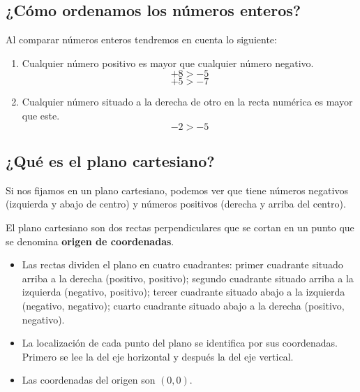\subsection{¿Cómo ordenamos los números enteros?}

Al comparar números enteros tendremos en cuenta lo siguiente:

\begin{enumerate}
    \item Cualquier número positivo es mayor que cualquier número negativo.
    \[+8 > -5\]
    \[+5 > -7\]
    \item Cualquier número situado a la derecha de otro en la recta numérica es mayor que este.
    \[-2 > -5\]
\end{enumerate}

\begin{center}
\end{center}

\subsection{¿Qué es el plano cartesiano?}

Si nos fijamos en un plano cartesiano, podemos ver que tiene números negativos (izquierda y abajo de centro) y números positivos (derecha y arriba del centro).

El plano cartesiano son dos rectas perpendiculares que se cortan en un punto que se denomina \textbf{origen de coordenadas}.

\begin{itemize}
    \item Las rectas dividen el plano en cuatro cuadrantes: primer cuadrante situado arriba a la derecha (positivo, positivo); segundo cuadrante situado arriba a la izquierda (negativo, positivo); tercer cuadrante situado abajo a la izquierda (negativo, negativo); cuarto cuadrante situado abajo a la derecha (positivo, negativo).
    \item La localización de cada punto del plano se identifica por sus coordenadas. Primero se lee la del eje horizontal y después la del eje vertical.
    \item Las coordenadas del origen son $(0, 0)$.
\end{itemize}

